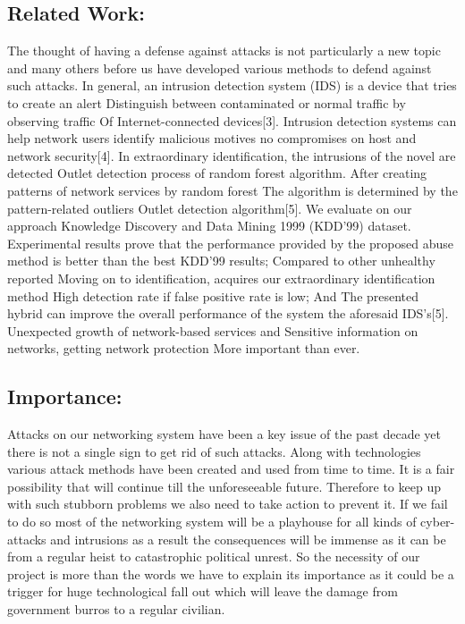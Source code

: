\documentclass[conference]{IEEEtran}
\begin{document}
\subsection{Related Work:}
The thought of having a defense against attacks is not particularly a new topic and many others before us have developed various methods to defend against such attacks. In general, an intrusion detection system (IDS) is a device that tries to create an alert Distinguish between contaminated or normal traffic by observing traffic Of Internet-connected devices[3]. Intrusion detection systems can help network users identify malicious motives no compromises on host and network security[4]. In extraordinary identification, the intrusions of the novel are detected Outlet detection process of random forest algorithm. After creating patterns of network services by random forest The algorithm is determined by the pattern-related outliers Outlet detection algorithm[5]. We evaluate on our approach Knowledge Discovery and Data Mining 1999 (KDD’99) dataset. Experimental results prove that the performance provided by the proposed abuse method is better than the best KDD’99 results; Compared to other unhealthy reported Moving on to identification, acquires our extraordinary identification method High detection rate if false positive rate is low; And The presented hybrid can improve the overall performance of the system the aforesaid IDS’s[5]. Unexpected growth of network-based services and Sensitive information on networks, getting network protection More important than ever.



\subsection{Importance: }
Attacks on our networking system have been a key issue of the past decade yet there is not a single sign to get rid of such attacks. Along with technologies various attack methods have been created and used from time to time. It is a fair possibility that will continue till the unforeseeable future. Therefore to keep up with such stubborn problems we also need to take action to prevent it. If we fail to do so most of the networking system will be a playhouse for all kinds of cyber-attacks and intrusions as a result the consequences will be immense as it can be from a regular heist to catastrophic political unrest. So the necessity of our project is more than the words we have to explain its importance as it could be a trigger for huge technological fall out which will leave the damage from government burros to a regular civilian.   
\end{document}
